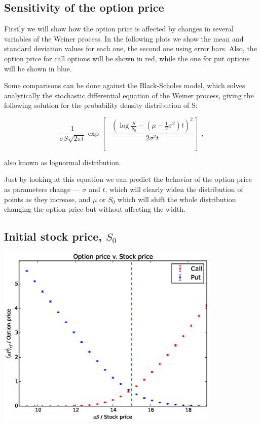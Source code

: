 \documentclass[8 pt]{article}
\newenvironment{Figure}
  {\par\medskip\noindent\minipage{\linewidth}}
  {\endminipage\par\medskip}
\begin{document}
\begin{multicols*}{2}
\section{Sensitivity of the option price}

Firstly we will show how the option price is affected by changes in several variables of the Weiner process. In the following plots we show the mean and standard deviation values for each one, the second one using error bars. Also, the option price for call options will be shown in red, while the one for put options will be shown in blue.

Some comparisons can be done against the Black-Scholes model, which solves analytically the stochastic differential equation of the Weiner process, giving the following solution \cite{Wilmott} for the probability density distribution of S:

\begin{equation} \label{eq:weinersol}
  \frac{1}{\sigma S \sqrt{2\pi t}} \exp\left[ -\frac{\left(\log\frac{S}{S_0} - (\mu - \frac{1}{2}\sigma^2)t\right)^2}{2\sigma^2 t}\right] ~~,
\end{equation}

also known as lognormal distribution.

Just by looking at this equation we can predict the behavior of the option price as parameters change --- $\sigma$ and $t$, which will clearly widen the distribution of points as they increase, and $\mu$ or $S_0$ which will shift the whole distribution changing the option price but without affecting the width.

\subsection{Initial stock price, $S_0$}

\begin{Figure}
  \begin{center}
    \includegraphics[width=0.8\textwidth]{graphs/oP_stock.eps}
    \label{fig:stock_sens}
  \end{center}
\end{Figure}


\end{multicols*}
\end{document}
